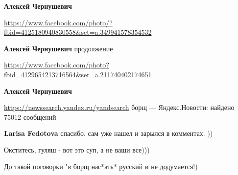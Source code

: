 \begin{itemize}
\begin{itemize}
 
\textbf{Алексей Чернушевич} 

\url{https://www.facebook.com/photo/?fbid=4125180940830558&set=a.349941578354532}

 
\textbf{Алексей Чернушевич} продолжение 

\url{https://www.facebook.com/photo?fbid=4129654213716564&set=a.211740402174651}


 
\textbf{Алексей Чернушевич} \Laughey[1.0][white] 

\url{https://newssearch.yandex.ru/yandsearch}
борщ — Яндекс.Новости: найдено 75012 сообщений

 
\textbf{Larisa Fedotova} спасибо, сам уже нашел и зарылся в комментах. ))
\end{itemize}

 
Окститесь, гуляш - вот это суп, а не ваши все)))

 
До такой поговорки "в борщ нас*ать* русский и не додумается!)


\end{itemize}
